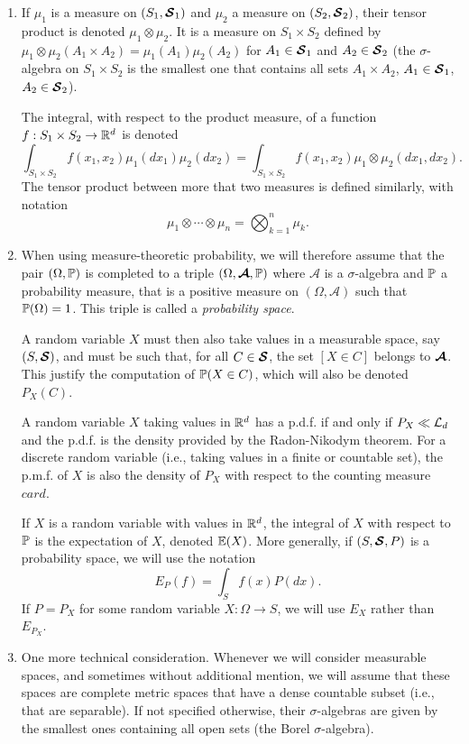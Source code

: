 \begin{enumerate}[label={\bf \arabic*.}]
\item
If $\mu_1$ is a measure on  $(S_1 , \bm{{\mathcal S}}_1)$ and $\mu_2$ a measure on  $(S_2 , \bm{{\mathcal S}}_2)$, their tensor product is denoted $\mu_1 \otimes \mu_2$. It is a measure on $S_1\times S_2$ defined by $\mu_1\otimes\mu_2(A_1 \times A_2) = \mu_1(A_1) \mu_2(A_2)$ for $A_1 \in \bm{{\mathcal S}}_1$ and $A_2 \in \bm{{\mathcal S}}_2$ (the $\sigma$-algebra on $S_1 \times S_2$ is the smallest one that contains all sets $A_1 \times A_2$, $A_1 \in \bm{{\mathcal S}}_1$, $A_2 \in \bm{{\mathcal S}}_2$). 

The integral, with respect to the product measure, of a function $f: S_1 \times S_2 \to {\mathbb{R}}^d$ is denoted
\[
\int_{S_1\times S_2} f(x_1, x_2) \mu_1(dx_1)  \mu_2(dx_2) = 
\int_{S_1\times S_2} f(x_1, x_2) \mu_1\otimes \mu_2(dx_1, dx_2).
\]
The tensor product between more that two measures is defined similarly, with notation
\[
\mu_1 \otimes \cdots \otimes \mu_n = \bigotimes_{k=1}^n \mu_k.
\] 

\item When using measure-theoretic probability, we will therefore assume that the  pair $(\Omega, \bm{\mathbb P})$ is completed to a triple $(\Omega, \bm{\mathcal A}, \bm{\mathbb P})$ where $\mathcal A$ is a $\sigma$-algebra and $\bm{\mathbb P}$ a probability measure, that is a positive measure on  $(\Omega, \boldsymbol{\mathcal A})$ such that $\bm{\mathbb P}(\Omega) = 1$. This triple is called a {\em probability space}.

A random variable $X$ must then also take values in a measurable space, say $(S, \bm{{\mathcal S}})$, and must be such that, for all $C\in \bm{{\mathcal S}}$, the set $[X\in C]$ belongs to $\bm{{\mathcal A}}$. This justify the computation of $\bm{\mathbb P}(X\in C)$, which will also be denoted $P_X(C)$. 

A random variable $X$ taking values in ${\mathbb{R}}^d$ has a p.d.f. if and only if $P_X \ll {\mathcal L}_d$ and the  p.d.f. is the density provided by the Radon-Nikodym theorem. For a discrete random variable (i.e., taking values in a finite or countable set), the p.m.f. of $X$ is also the density of $P_X$ with respect to the counting measure $\mathit{card}$.

If $X$ is a random variable with values in ${\mathbb{R}}^d$, the integral of $X$ with respect to $\bm{\mathbb P}$ is the expectation of $X$,  denoted $\bm{\mathbb E}(X)$. More generally, if $(S, \bm{{\mathcal S}}, P)$ is a probability space, we will use the notation
\[
E_P(f) = \int_S f(x) P(dx).
\]
If $P = P_X$ for some random variable $X:\Omega\to S$, we will use $E_X$ rather than $E_{P_X}$.

\item One more technical consideration. Whenever we will consider measurable spaces, and sometimes without additional mention, we will assume that these spaces are complete metric spaces that have a dense countable subset (i.e., that are separable). If not specified otherwise, their $\sigma$-algebras are given by the smallest ones containing all open sets (the Borel $\sigma$-algebra). 



\end{enumerate}